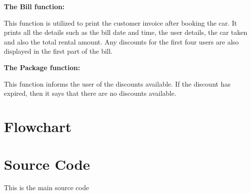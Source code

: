 \documentclass[12pt]{article}
\begin{document}
\noindent
\textbf{The Bill function:}
\par This function is utilized to print the customer invoice after booking the car. It prints all the details such as the bill date and time, the user details, the car taken and also the total rental amount. Any discounts for the first four users are also displayed in the first part of the bill.

\noindent
\textbf{The Package function:}
\par This function informs the user of the discounts available. If the discount has expired, then it says that there are no discounts available. 

\newpage                            %
\section{Flowchart}    %

\begin{minipage}{\textwidth}
  
\end{minipage}


















\newpage                            %
\section{Source Code}               %



This is the main source code
\end{document}
